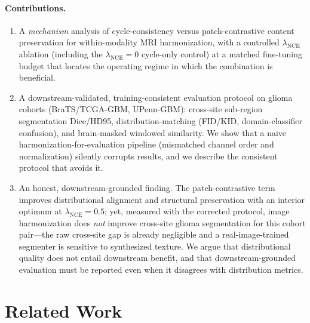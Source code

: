 \documentclass[runningheads]{llncs}
\begin{document}
\paragraph{Contributions.}
\begin{enumerate}
  \item A \emph{mechanism} analysis of cycle-consistency versus patch-contrastive
        content preservation for within-modality MRI harmonization, with a
        controlled $\lambda_{\mathrm{NCE}}$ ablation (including the
        $\lambda_{\mathrm{NCE}}{=}0$ cycle-only control) at a matched fine-tuning
        budget that locates the operating regime in which the combination is
        beneficial.
  \item A downstream-validated, training-consistent evaluation protocol on glioma
        cohorts (BraTS/TCGA-GBM, UPenn-GBM): cross-site sub-region segmentation
        Dice/HD95, distribution-matching (FID/KID, domain-classifier confusion),
        and brain-masked windowed similarity. We show that a naive
        harmonization-for-evaluation pipeline (mismatched channel order and
        normalization) silently corrupts results, and we describe the consistent
        protocol that avoids it.
  \item An honest, downstream-grounded finding. The patch-contrastive term
        improves distributional alignment and structural preservation with an
        interior optimum at $\lambda_{\mathrm{NCE}}{=}0.5$; yet, measured with the
        corrected protocol, image harmonization does \emph{not} improve cross-site
        glioma segmentation for this cohort pair---the raw cross-site gap is
        already negligible and a real-image-trained segmenter is sensitive to
        synthesized texture. We argue that distributional quality does not entail
        downstream benefit, and that downstream-grounded evaluation must be
        reported even when it disagrees with distribution metrics.
\end{enumerate}

\section{Related Work}
\label{sec:related}
\end{document}
